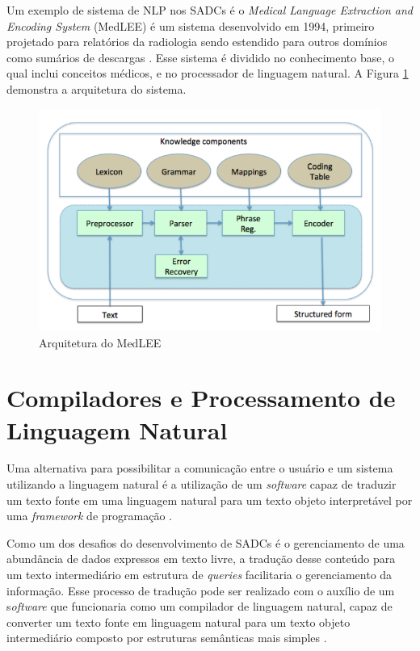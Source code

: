 \documentclass[12pt]{article}
\begin{document}
Um exemplo de sistema de NLP nos SADCs é o \textit{Medical Language Extraction and Encoding System} (MedLEE) é um sistema desenvolvido em 1994, primeiro projetado para relatórios da radiologia sendo estendido para outros domínios como sumários de descargas \cite{nlp_biomedicine_arquitecture}. Esse sistema é dividido no conhecimento base, o qual inclui conceitos médicos, e no processador de linguagem natural. A Figura \ref{fig:medLEE_arquitetura} demonstra a arquitetura do sistema.

\begin{figure}[ht]
    \centering
    \includegraphics[scale=0.67]{Imagens/fluxograma_arquitetura_nlp_medLEE.png}
    \caption{Arquitetura do MedLEE \cite{nlp_biomedicine_arquitecture}}
    \label{fig:medLEE_arquitetura}
\end{figure}


\section{Compiladores e Processamento de Linguagem Natural}

Uma  alternativa para possibilitar a comunicação entre o usuário e um sistema utilizando a linguagem natural é a utilização de um \textit{software} capaz de traduzir um texto fonte em uma linguagem natural para um texto objeto interpretável por uma \textit{framework} de programação \cite{compiler_natural_language}.

Como um dos desafios do desenvolvimento de SADCs é o gerenciamento de uma abundância de dados expressos em texto livre, a tradução desse conteúdo para um texto intermediário em estrutura de \textit{queries} facilitaria o gerenciamento da informação. Esse processo de tradução pode ser realizado com o auxílio de um s\textit{oftware } que funcionaria  como um compilador de linguagem natural, capaz de converter um texto fonte em linguagem natural para um texto objeto intermediário composto por estruturas semânticas mais simples \cite{compiler_on-line_data}.
\end{document}
